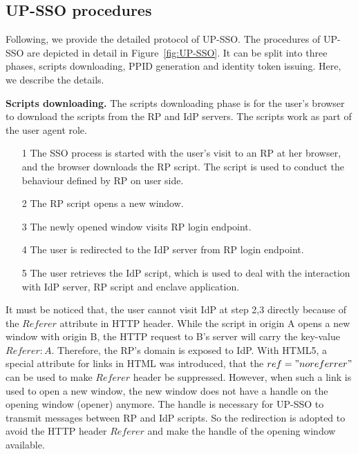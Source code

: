 \subsection{UP-SSO procedures}
Following, we provide the detailed protocol of UP-SSO.
The procedures of UP-SSO are depicted in detail in Figure~\ref{fig:UP-SSO}. It can be split into three phases, scripts downloading, PPID generation and identity token issuing. Here, we describe the details. 

\vspace{3mm}\noindent\textbf{Scripts downloading.} The scripts downloading phase is for the user’s browser to download the scripts from the RP and IdP servers. The scripts work as part of the user agent role.
\begin{itemize}
\item[1]The SSO process is started with the user's visit to an RP at her browser, and the browser downloads the RP script. The script is used to conduct the behaviour defined by RP on user side.
\item[2]The RP script opens a new window. 
\item[3]The newly opened window visits RP login endpoint.
\item[4]The user is redirected to the IdP server from RP login endpoint.
\item[5]The user retrieves the IdP script, which is used to deal with the interaction with IdP server, RP script and enclave application.
\end{itemize}
It must be noticed that, the user cannot visit IdP at step 2,3 directly because of the $Referer$ attribute in HTTP header. While the script in origin A opens a new window with origin B, the HTTP request to B's server will carry the key-value $Referer: A$. Therefore, the RP's domain is exposed to IdP. With HTML5, a special attribute for links in HTML was introduced, that the $ref="noreferrer"$ can be used to make $Referer$ header be suppressed. However, when such a link is used to open a new window, the new window does not have a handle on the opening window (opener) anymore. The handle is necessary for UP-SSO to transmit messages between RP and IdP scripts. So the redirection is adopted to avoid the HTTP header $Referer$ and make the handle of the opening window available. 


